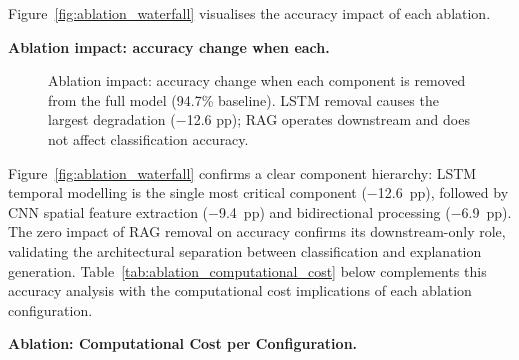Figure~\ref{fig:ablation_waterfall} visualises the accuracy impact of each ablation.

\noindent\textbf{Ablation impact: accuracy change when each.}

\begin{figure}[!htbp]
\centering
{}
\caption[Ablation Impact on Accuracy]{Ablation impact: accuracy change when each component is removed from the full model (94.7\% baseline). LSTM removal causes the largest degradation ($-$12.6 pp); RAG operates downstream and does not affect classification accuracy.}
\end{figure}

\noindent Figure~\ref{fig:ablation_waterfall} confirms a clear component hierarchy: LSTM temporal modelling is the single most critical component ($-$12.6~pp), followed by CNN spatial feature extraction ($-$9.4~pp) and bidirectional processing ($-$6.9~pp). The zero impact of RAG removal on accuracy confirms its downstream-only role, validating the architectural separation between classification and explanation generation. Table~\ref{tab:ablation_computational_cost} below complements this accuracy analysis with the computational cost implications of each ablation configuration.



\noindent\textbf{Ablation: Computational Cost per Configuration.}

